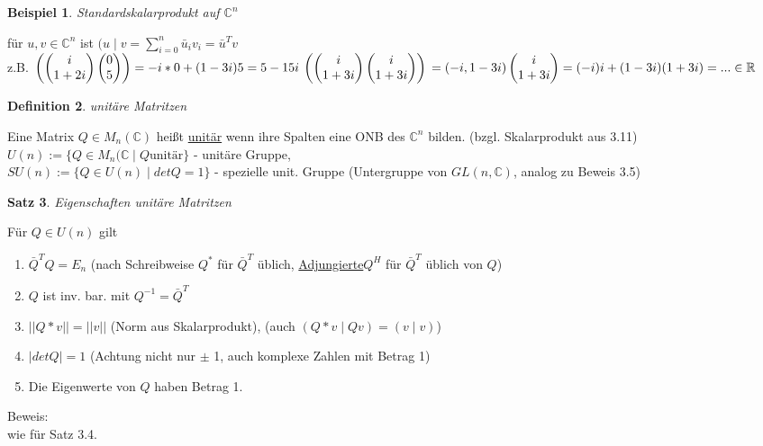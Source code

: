\documentclass[a4paper,11pt]{article}
\newtheorem{definition}{Definition}[section]
\newtheorem{satz}[definition]{Satz}
\newtheorem{bsp}[definition]{Beispiel}
\newcommand{\hsp}{\hspace{5mm}}
\begin{document}
\begin{bsp}
	Standardskalarprodukt auf $\mathbb{C}^n$
\end{bsp}
für $u,v\in\mathbb{C}^n$ ist $(u\mid v=\sum^n_{i=0}\bar u_iv_i=\bar u^Tv$ \\
z.B. $\left(\begin{pmatrix}i\\1+2i\end{pmatrix}\begin{pmatrix}0\\5\end{pmatrix}\right)=-i*0+(1-3i)5=5-15i\:\left(\begin{pmatrix}i\\1+3i\end{pmatrix}\begin{pmatrix}i\\1+3i\end{pmatrix}\right) \\
=(-i,1-3i)\begin{pmatrix}i\\1+3i\end{pmatrix}=(-i)i+(1-3i)(1+3i)=...\in\mathbb{R}$

\begin{definition}
	unitäre Matritzen
\end{definition}
Eine Matrix $Q\in M_n(\mathbb{C})$ heißt \underline{unitär} wenn ihre Spalten eine ONB des $\mathbb{C}^n$ bilden. (bzgl. Skalarprodukt aus 3.11) \\
$U(n):=\{Q\in M_n(\mathbb{C}\mid Q\text{unitär}\}$ - unitäre Gruppe, \\
$SU(n):=\{Q\in U(n)\mid detQ=1\}$ - spezielle unit. Gruppe (Untergruppe von $GL(n,\mathbb{C})$, analog zu Beweis 3.5)

\begin{satz}
	Eigenschaften unitäre Matritzen
\end{satz}
Für $Q\in U(n)$ gilt
\begin{enumerate}[label=\alph*)]
	\item $\bar Q^TQ=E_n$ (nach Schreibweise $Q^*$ für $\bar Q^T$ üblich, \underline{Adjungierte}\hsp $Q^H$ für $\bar Q^T$ üblich von $Q$)
	\item $Q$ ist inv. bar. mit $Q^{-1}=\bar Q^T$
	\item $\vert\vert Q*v\vert\vert=\vert\vert v\vert\vert$ (Norm aus Skalarprodukt), (auch $(Q*v\mid Qv)=(v\mid v)$)
	\item $\vert detQ\vert=1$ (Achtung nicht nur $\pm$ 1, auch komplexe Zahlen mit Betrag 1)
	\item Die Eigenwerte von $Q$ haben Betrag 1.
\end{enumerate}
Beweis: \\
wie für Satz 3.4.
\end{document}
